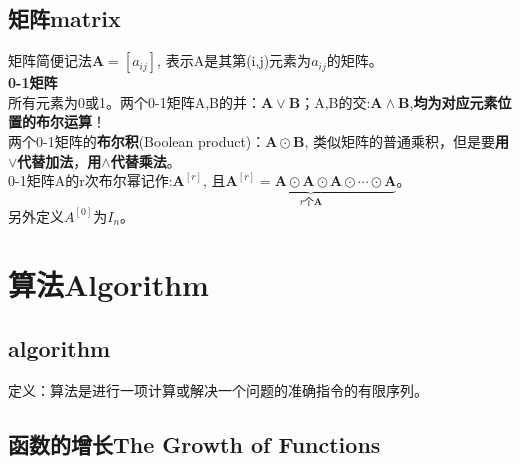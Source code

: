 \documentclass{article}
\begin{document}
    \subsection{矩阵matrix}
    矩阵简便记法$\boldsymbol{A}=\left[a_{i j}\right]$, 表示A是其第(i,j)元素为$a_{ij}$的矩阵。\\
    \textbf{0-1矩阵}\\
    所有元素为0或1。两个0-1矩阵A,B的并：$\boldsymbol{A} \vee \boldsymbol{B}$；A,B的交:$\boldsymbol{A} \wedge \boldsymbol{B}$,\textbf{均为对应元素位置的布尔运算}！
    \\
    两个0-1矩阵的\textbf{布尔积}(Boolean product)：$\boldsymbol{A} \odot \boldsymbol{B}$, 类似矩阵的普通乘积，但是要\textbf{用$\vee$代替加法}，\textbf{用$\wedge$代替乘法}。
    \\
    0-1矩阵A的r次布尔幂记作:$\boldsymbol{A}^{[r]}$, 且$\underbrace{\boldsymbol{A}^{[r]}=\boldsymbol{A} \odot \boldsymbol{A} \odot \boldsymbol{A} \odot \cdots \odot \boldsymbol{A}}_{r\text{个}\bm{A}}$。
    \\
    另外定义$A^{[0]} \text{为} I_{n}$。

    \section{算法Algorithm}
    \subsection{algorithm}
    定义：算法是进行一项计算或解决一个问题的准确指令的有限序列。
    \subsection{函数的增长The Growth of Functions}
    
\end{document}
